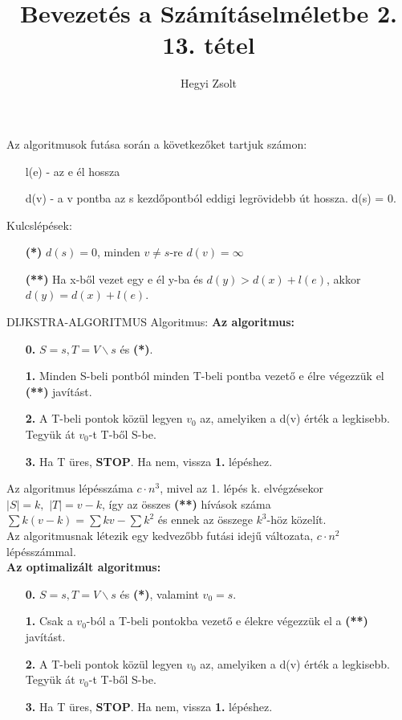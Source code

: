 \documentclass[]{article}
\title{Bevezetés a Számításelméletbe 2.\\{\large 13. tétel}}
\author{Hegyi Zsolt}
\begin{document}
\maketitle
\begin{framed}
Az algoritmusok futása során a következőket tartjuk számon:
\begin{itemize}
\item[] l(e) - az e él hossza
\item[] d(v) - a v pontba az s kezdőpontból eddigi legrövidebb út hossza. d(s) = 0.
\end{itemize}
Kulcslépések:
\begin{itemize}
\item[\textbf{(*)}]$d(s) = 0$, minden $v \neq s$-re $d(v) = \infty$
\item[\textbf{(**)}]Ha x-ből vezet egy e él y-ba és $d(y) > d(x) + l(e)$, akkor $d(y) = d(x) + l(e)$.
\end{itemize}
\end{framed}
\begin{framed}
DIJKSTRA-ALGORITMUS Algoritmus:
\textbf{Az algoritmus:}
\begin{itemize}
\item[\textbf{0.}] $S = {s}, T = V\backslash {s}$ és \textbf{(*)}.
\item[\textbf{1.}] Minden S-beli pontból minden T-beli pontba vezető e élre végezzük el \textbf{(**)} javítást.
\item[\textbf{2.}] A T-beli pontok közül legyen $v_0$ az, amelyiken a d(v) érték a legkisebb. Tegyük át $v_0$-t T-ből S-be.
\item[\textbf{3.}] Ha T üres, \textbf{STOP}. Ha nem, vissza \textbf{1.} lépéshez.
\end{itemize}
Az algoritmus lépésszáma $c\cdot n^3$, mivel az 1. lépés k. elvégzésekor $|S| = k,\,\, |T| = v - k$, így az összes \textbf{(**)} hívások száma $\sum k(v-k) = \sum kv - \sum k^2$ és ennek az összege $k^3$-höz közelít.\\Az algoritmusnak létezik egy kedvezőbb futási idejű változata, $c\cdot n^2$ lépésszámmal.\\
\textbf{Az optimalizált algoritmus:}
\begin{itemize}
\item[\textbf{0.}] $S = {s}, T = V\backslash {s}$ és \textbf{(*)}, valamint $v_0 = s$.
\item[\textbf{1.}] Csak a $v_0$-ból a T-beli pontokba vezető e élekre végezzük el a \textbf{(**)} javítást.
\item[\textbf{2.}] A T-beli pontok közül legyen $v_0$ az, amelyiken a d(v) érték a legkisebb. Tegyük át $v_0$-t T-ből S-be.
\item[\textbf{3.}] Ha T üres, \textbf{STOP}. Ha nem, vissza \textbf{1.} lépéshez.
\end{itemize}
\end{framed}
\end{document}
